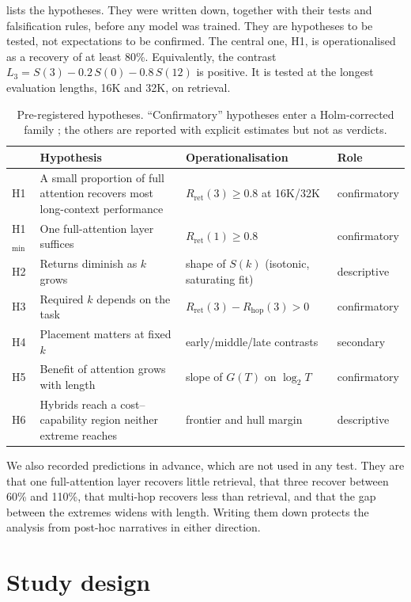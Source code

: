 \documentclass[10pt,a4paper]{article}
\begin{document}
 lists the hypotheses. They were written down, together with their tests and
falsification rules, before any model was trained. They are hypotheses to be tested, not
expectations to be confirmed. The central one, H1, is operationalised as a recovery of at least
80\%. Equivalently, the contrast $L_3=S(3)-0.2\,S(0)-0.8\,S(12)$ is positive. It is tested at the
longest evaluation lengths, 16K and 32K, on retrieval.

\begin{table}[t]
\centering\tablefont
\caption{Pre-registered hypotheses. ``Confirmatory'' hypotheses enter a Holm-corrected family
\citep{holm1979simple}; the others are reported with explicit estimates but not as verdicts.}
\label{tab:hyp}
\begin{tabularx}{\textwidth}{@{}l X l l@{}}
\toprule
& Hypothesis & Operationalisation & Role \\
\midrule
H1 & A small proportion of full attention recovers most long-context performance & $R_{\text{ret}}(3)\ge0.8$ at 16K/32K & confirmatory \\
H1$_{\min}$ & One full-attention layer suffices & $R_{\text{ret}}(1)\ge0.8$ & confirmatory \\
H2 & Returns diminish as $k$ grows & shape of $S(k)$ (isotonic, saturating fit) & descriptive \\
H3 & Required $k$ depends on the task & $R_{\text{ret}}(3)-R_{\text{hop}}(3)>0$ & confirmatory \\
H4 & Placement matters at fixed $k$ & early/middle/late contrasts & secondary \\
H5 & Benefit of attention grows with length & slope of $G(T)$ on $\log_2T$ & confirmatory \\
H6 & Hybrids reach a cost--capability region neither extreme reaches & frontier and hull margin & descriptive \\
\bottomrule
\end{tabularx}
\end{table}

We also recorded predictions in advance, which are not used in any test. They are that one
full-attention layer recovers little retrieval, that three recover between 60\% and 110\%, that
multi-hop recovers less than retrieval, and that the gap between the extremes widens with length.
Writing them down protects the analysis from post-hoc narratives in either direction.

\section{Study design}\label{sec:design}
\end{document}

